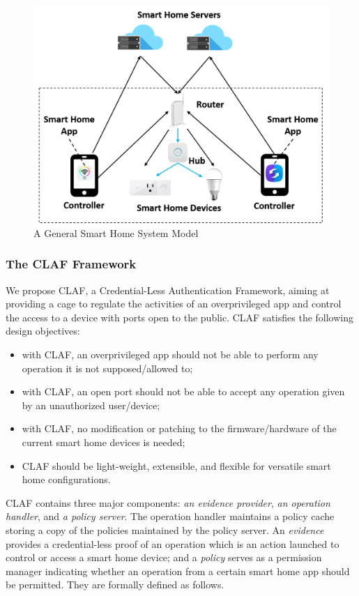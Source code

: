 \documentclass[letterpaper,12pt]{article}
\begin{document}
\begin{figure}[!htb]
        \centering
        \includegraphics[scale=0.3]{system.png}
        \caption{A General Smart Home System Model}
        \label{fig:system}
\end{figure}




\subsubsection{The CLAF Framework} \label{sec:CLAF:Framework}

We propose CLAF, a Credential-Less Authentication Framework, aiming at providing a cage to regulate the activities of an overprivileged app and control the access to a device with ports open to the public. CLAF satisfies the following design objectives:
\begin{itemize}
\item with CLAF, an overprivileged app should not be able to perform any operation it is not supposed/allowed to;
\item with CLAF, an open port should not be able to accept any operation given by an unauthorized user/device;
\item with CLAF, no modification or patching to the firmware/hardware of the current smart home devices is needed;
\item CLAF should be light-weight, extensible, and flexible for versatile smart home configurations. 
\end{itemize}

CLAF contains three major components: \emph{an evidence provider}, \emph{an operation handler}, and \emph{a policy server}. The operation handler maintains a policy cache storing a copy of the policies maintained by the policy server. An \textit{evidence} provides a credential-less proof of an operation which is an action launched to control or access a smart home device; and a \textit{policy} serves as a permission manager indicating whether an operation from a certain smart home app should be permitted. They are formally defined as follows.
\end{document}
